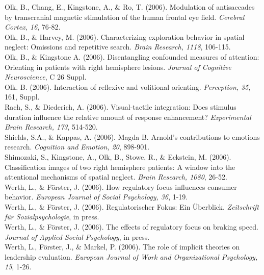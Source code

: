 Olk, B., Chang, E., Kingstone, A., \& Ro, T. (2006). Modulation of antisaccades by transcranial magnetic stimulation of the human frontal eye field. \textit{Cerebral Cortex, 16}, 76-82.\\ 

Olk, B., \& Harvey, M. (2006). Characterizing exploration behavior in spatial neglect: Omissions and repetitive search. \textit{Brain Research, 1118}, 106-115.\\ 

Olk, B., \& Kingstone A. (2006). Disentangling confounded measures of attention: Orienting in patients with right hemisphere lesions. \textit{Journal of Cognitive Neuroscience}, C 26 Suppl.\\ 

Olk. B. (2006). Interaction of reflexive and volitional orienting. \textit{Perception, 35}, 161, Suppl.\\ 

Rach, S., \& Diederich, A. (2006). Visual-tactile integration: Does stimulus duration influence the relative amount of response enhancement? \textit{Experimental Brain Research, 173}, 514-520.\\ 

Shields, S.A., \& Kappas, A. (2006). Magda B. Arnold's contributions to emotions research. \textit{Cognition and Emotion, 20}, 898-901.\\ 

Shimozaki, S., Kingstone, A., Olk, B., Stowe, R., \& Eckstein, M. (2006). Classification images of two right hemisphere patients: A window into the attentional mechanisms of spatial neglect. \textit{Brain Research, 1080}, 26-52.\\ 

Werth, L., \& F\"{o}rster, J. (2006). How regulatory focus influences consumer behavior. \textit{European Journal of Social Psychology, 36}, 1-19. \\ 

Werth, L., \&  F\"{o}rster, J. (2006). Regulatorischer Fokus: Ein \"{U}berblick. \textit{Zeitschrift f\"{u}r Sozialpsychologie}, in press.\\ 

Werth, L., \& F\"{o}rster, J. (2006). The effects of regulatory focus on braking speed. \textit{Journal of Applied Social Psychology}, in press.\\ 

Werth, L., F\"{o}rster, J., \& Markel, P. (2006). The role of implicit theories on leadership evaluation. \textit{European Journal of Work and Organizational Psychology, 15}, 1-26.\\ 

